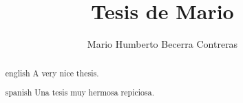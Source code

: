 \documentclass{docITAM}
\title{Tesis de Mario}
\author{Mario Humberto Becerra Contreras}
\begin{document}
	\npthousandsep{,}
	\maketitle
	\publicationrights


	
	


	\begin{abstract}{english}
		A very nice thesis.
	\end{abstract}

	\begin{abstract}{spanish}
		Una tesis muy hermosa repiciosa.
	\end{abstract}


	\setcounter{page}{1}

	\tableofcontents
	\listoffigures
	\listoftables
	\newpage

	\setcounter{page}{1}


	


	
	
	
	

	

	




	\appendix

	\clearpage



\begingroup
\raggedright
\sloppy
\printbibliography
\endgroup

\end{document}
